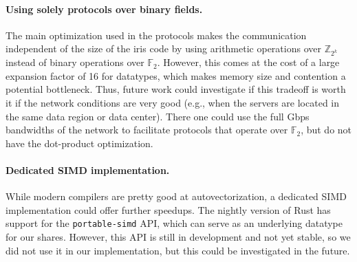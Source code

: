 \documentclass[a4paper,11pt,
]{article}
\newcommand{\F}{\ensuremath{\mathbb{F}}\xspace}
\newcommand{\Z}{\ensuremath{\mathbb{Z}}\xspace}
\begin{document}
\paragraph{Using solely protocols over binary fields.}
The main optimization used in the protocols makes the communication independent of the size of the iris code by using arithmetic operations over $\Z_{2^k}$ instead of binary operations over $\F_2$. However, this comes at the cost of a large expansion factor of 16 for datatypes, which makes memory size and contention a potential bottleneck. Thus, future work could investigate if this tradeoff is worth it if the network conditions are very good (e.g., when the servers are located in the same data region or data center). There one could use the full Gbps bandwidths of the network to facilitate protocols that operate over $\F_2$, but do not have the dot-product optimization.

\paragraph{Dedicated SIMD implementation.}
While modern compilers are pretty good at autovectorization, a dedicated SIMD implementation could offer further speedups. The nightly version of Rust has support for the \texttt{portable-simd} API, which can serve as an underlying datatype for our shares. However, this API is still in development and not yet stable, so we did not use it in our implementation, but this could be investigated in the future.

\printbibliography
\end{document}

